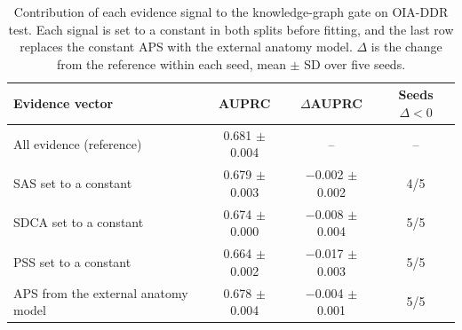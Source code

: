 \begin{table}[t]
\centering
\caption{Contribution of each evidence signal to the knowledge-graph gate on OIA-DDR test. Each signal is set to a constant in both splits before fitting, and the last row replaces the constant APS with the external anatomy model. $\Delta$ is the change from the reference within each seed, mean $\pm$ SD over five seeds.}
\label{tab:evidence}
\footnotesize
\setlength{\tabcolsep}{4pt}
\begin{tabular}{@{}lccc@{}}
\toprule
Evidence vector & AUPRC & $\Delta$AUPRC & Seeds $\Delta<0$ \\
\midrule
All evidence (reference) & 0.681 $\pm$ 0.004 & -- & -- \\
\midrule
SAS set to a constant & 0.679 $\pm$ 0.003 & $-$0.002 $\pm$ 0.002 & 4/5 \\
SDCA set to a constant & 0.674 $\pm$ 0.000 & $-$0.008 $\pm$ 0.004 & 5/5 \\
PSS set to a constant & 0.664 $\pm$ 0.002 & $-$0.017 $\pm$ 0.003 & 5/5 \\
APS from the external anatomy model & 0.678 $\pm$ 0.004 & $-$0.004 $\pm$ 0.001 & 5/5 \\
\bottomrule
\end{tabular}
\end{table}
